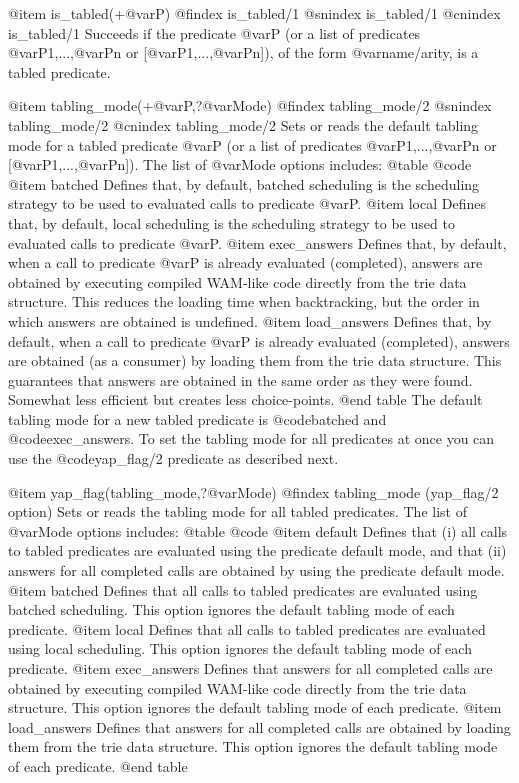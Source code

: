 @item is_tabled(+@var{P})
@findex is_tabled/1
@snindex is_tabled/1
@cnindex is_tabled/1
Succeeds if the predicate @var{P} (or a list of predicates
@var{P1},...,@var{Pn} or [@var{P1},...,@var{Pn}]), of the form
@var{name/arity}, is a tabled predicate.

@item tabling_mode(+@var{P},?@var{Mode})
@findex tabling_mode/2
@snindex tabling_mode/2
@cnindex tabling_mode/2
Sets or reads the default tabling mode for a tabled predicate @var{P}
(or a list of predicates @var{P1},...,@var{Pn} or
[@var{P1},...,@var{Pn}]). The list of @var{Mode} options includes:
@table @code
@item batched
      Defines that, by default, batched scheduling is the scheduling
      strategy to be used to evaluated calls to predicate @var{P}.
@item local
      Defines that, by default, local scheduling is the scheduling
      strategy to be used to evaluated calls to predicate @var{P}.
@item exec_answers
      Defines that, by default, when a call to predicate @var{P} is
      already evaluated (completed), answers are obtained by executing
      compiled WAM-like code directly from the trie data
      structure. This reduces the loading time when backtracking, but
      the order in which answers are obtained is undefined.
@item load_answers
      Defines that, by default, when a call to predicate @var{P} is
      already evaluated (completed), answers are obtained (as a
      consumer) by loading them from the trie data structure. This
      guarantees that answers are obtained in the same order as they
      were found. Somewhat less efficient but creates less choice-points.
@end table
The default tabling mode for a new tabled predicate is @code{batched}
and @code{exec_answers}. To set the tabling mode for all predicates at
once you can use the @code{yap_flag/2} predicate as described next.

@item yap_flag(tabling_mode,?@var{Mode})
@findex tabling_mode (yap_flag/2 option)
Sets or reads the tabling mode for all tabled predicates. The list of
@var{Mode} options includes:
@table @code
@item default
      Defines that (i) all calls to tabled predicates are evaluated
      using the predicate default mode, and that (ii) answers for all
      completed calls are obtained by using the predicate default mode.
@item batched
      Defines that all calls to tabled predicates are evaluated using
      batched scheduling. This option ignores the default tabling mode
      of each predicate.
@item local
      Defines that all calls to tabled predicates are evaluated using
      local scheduling. This option ignores the default tabling mode
      of each predicate.
@item exec_answers
      Defines that answers for all completed calls are obtained by
      executing compiled WAM-like code directly from the trie data
      structure. This option ignores the default tabling mode
      of each predicate.
@item load_answers
      Defines that answers for all completed calls are obtained by
      loading them from the trie data structure. This option ignores
      the default tabling mode of each predicate.
@end table

